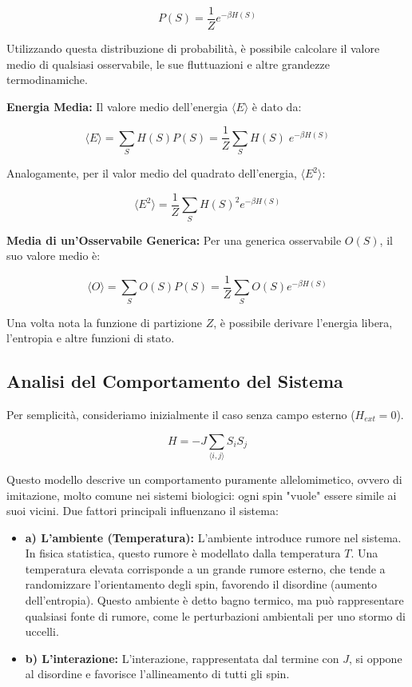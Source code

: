 \begin{equation} \label{eq:ch16_15}
P(S) = \frac{1}{Z} e^{-\beta H(S)} 
\end{equation}

Utilizzando questa distribuzione di probabilità, è possibile calcolare il valore medio di qualsiasi osservabile, le sue fluttuazioni e altre grandezze termodinamiche.

\textbf{Energia Media:}
Il valore medio dell'energia $\langle E \rangle$ è dato da:

\begin{equation} \label{eq:ch16_16}
\langle E \rangle = \sum_S H(S) P(S) = \frac{1}{Z} \sum_S H(S) \; e^{-\beta H(S)} 
\end{equation}

Analogamente, per il valor medio del quadrato dell'energia, $\langle E^2 \rangle$:

\begin{equation} \label{eq:ch16_17}
\langle E^2 \rangle = \frac{1}{Z} \sum_S H(S)^2 e^{-\beta H(S)} 
\end{equation}

\textbf{Media di un'Osservabile Generica:}
Per una generica osservabile $O(S)$, il suo valore medio è:

\begin{equation} \label{eq:ch16_18}
\langle O \rangle = \sum_S O(S) P(S) = \frac{1}{Z} \sum_S O(S) e^{-\beta H(S)} 
\end{equation}

Una volta nota la funzione di partizione $Z$, è possibile derivare l'energia libera, l'entropia e altre funzioni di stato.

\subsection*{Analisi del Comportamento del Sistema}
Per semplicità, consideriamo inizialmente il caso senza campo esterno ($H_{ext} = 0$).

\begin{equation} \label{eq:ch16_19}
H = -J \sum_{\langle i,j \rangle} S_i S_j
\end{equation}

Questo modello descrive un comportamento puramente allelomimetico, ovvero di imitazione, molto comune nei sistemi biologici: ogni spin "vuole" essere simile ai suoi vicini.
Due fattori principali influenzano il sistema:
\begin{itemize}
    \item \textbf{a) L'ambiente (Temperatura):} L'ambiente introduce rumore nel sistema. In fisica statistica, questo rumore è modellato dalla temperatura $T$. Una temperatura elevata corrisponde a un grande rumore esterno, che tende a randomizzare l'orientamento degli spin, favorendo il disordine (aumento dell'entropia). Questo ambiente è detto bagno termico, ma può rappresentare qualsiasi fonte di rumore, come le perturbazioni ambientali per uno stormo di uccelli.
    \item \textbf{b) L'interazione:} L'interazione, rappresentata dal termine con $J$, si oppone al disordine e favorisce l'allineamento di tutti gli spin.
\end{itemize}

